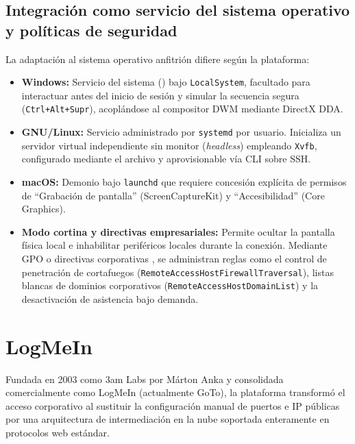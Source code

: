 \documentclass[12pt]{article}
\begin{document}
\subsection{Integración como servicio del sistema operativo y políticas de seguridad}\label{sec:crdIntegracion}

La adaptación al sistema operativo anfitrión difiere según la plataforma:
\begin{itemize}[noitemsep, topsep=4pt]
    \item \textbf{Windows:} Servicio del sistema () bajo \texttt{LocalSystem}, facultado para interactuar antes del inicio de sesión y simular la secuencia segura (\texttt{Ctrl+Alt+Supr}), acoplándose al compositor DWM mediante DirectX DDA.
    \item \textbf{GNU/Linux:} Servicio administrado por \texttt{systemd} por usuario. Inicializa un servidor virtual independiente sin monitor (\textit{headless}) empleando \texttt{Xvfb}, configurado mediante el archivo  y aprovisionable vía CLI sobre SSH.
    \item \textbf{macOS:} Demonio bajo \texttt{launchd} que requiere concesión explícita de permisos de \enquote{Grabación de pantalla} (ScreenCaptureKit) y \enquote{Accesibilidad} (Core Graphics).
    \item \textbf{Modo cortina y directivas empresariales:} Permite ocultar la pantalla física local e inhabilitar periféricos locales durante la conexión. Mediante GPO o directivas corporativas \parencite{googleChromeEnterprisePolicies}, se administran reglas como el control de penetración de cortafuegos (\texttt{RemoteAccess}\allowbreak\texttt{HostFirewall}\allowbreak\texttt{Traversal}), listas blancas de dominios corporativos (\texttt{RemoteAccess}\allowbreak\texttt{HostDomainList}) y la desactivación de asistencia bajo demanda.
\end{itemize}

\section{LogMeIn}\label{sec:logMeIn}

Fundada en 2003 como 3am Labs por Márton Anka y consolidada comercialmente como LogMeIn (actualmente GoTo), la plataforma transformó el acceso corporativo al sustituir la configuración manual de puertos e IP públicas por una arquitectura de intermediación en la nube soportada enteramente en protocolos web estándar.
\end{document}

